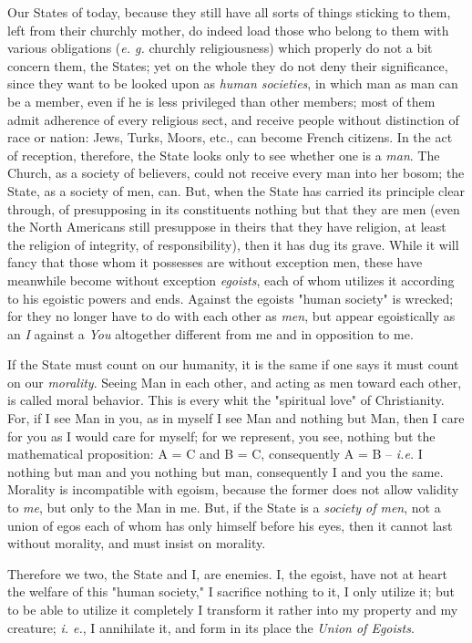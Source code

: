 Our States of today, because they still have all sorts of things sticking to 
them, left from their churchly mother, do indeed load those who belong to them 
with various obligations (\textit{e. g.} churchly religiousness) which 
properly do not a bit concern them, the States; yet on the whole they do not 
deny their significance, since they want to be looked upon as \textit{human 
societies}, in which man as man can be a member, even if he is less privileged 
than other members; most of them admit adherence of every religious sect, and 
receive people without distinction of race or nation: Jews, Turks, Moors, 
etc., can become French citizens. In the act of reception, therefore, the 
State looks only to see whether one is a \textit{man}. The Church, as a 
society of believers, could not receive every man into her bosom; the State, 
as a society of men, can. But, when the State has carried its principle clear 
through, of presupposing in its constituents nothing but that they are men 
(even the North Americans still presuppose in theirs that they have religion, 
at least the religion of integrity, of responsibility), then it has dug its 
grave. While it will fancy that those whom it possesses are without exception 
men, these have meanwhile become without exception \textit{egoists}, each of 
whom utilizes it according to his egoistic powers and ends. Against the 
egoists "{}human society"{} is wrecked; for they no longer have to do with 
each other as \textit{men}, but appear egoistically as an \textit{I} against a 
\textit{You} altogether different from me and in opposition to me.

If the State must count on our humanity, it is the same if one says it must 
count on our \textit{morality}. Seeing Man in each other, and acting as men 
toward each other, is called moral behavior. This is every whit the 
"{}spiritual love"{} of Christianity. For, if I see Man in you, as in myself I 
see Man and nothing but Man, then I care for you as I would care for myself; 
for we represent, you see, nothing but the mathematical proposition: A = C and 
B = C, consequently A = B -- \textit{i.e.} I nothing but man and you nothing 
but man, consequently I and you the same. Morality is incompatible with 
egoism, because the former does not allow validity to \textit{me}, but only to 
the Man in me. But, if the State is a \textit{society of men}, not a union of 
egos each of whom has only himself before his eyes, then it cannot last 
without morality, and must insist on morality.

Therefore we two, the State and I, are enemies. I, the egoist, have not at 
heart the welfare of this "{}human society,"{} I sacrifice nothing to it, I 
only utilize it; but to be able to utilize it completely I transform it rather 
into my property and my creature; \textit{i. e.}, I annihilate it, and form in 
its place the \textit{Union of Egoists}.

